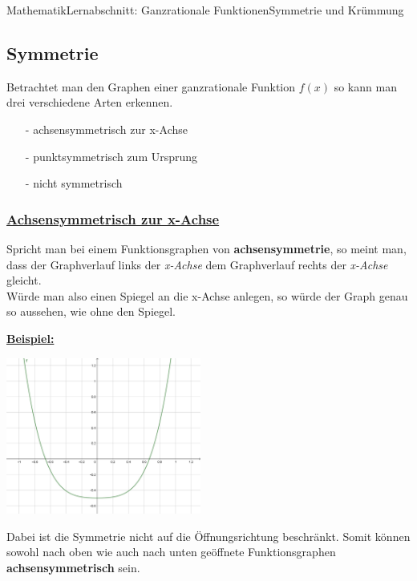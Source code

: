 \documentclass[11pt,twocolumn,oneside,openany,headings=optiontotoc,11pt,numbers=noenddot]{article}
\begin{document}
	\begin{worksheet}{Mathematik}{Lernabschnitt: Ganzrationale Funktionen}{Symmetrie und Krümmung}
		\setcounter{section}{6}
		\setcounter{subsection}{3}
		\noindent
		\subsection{Symmetrie}
		Betrachtet man den Graphen einer ganzrationale Funktion \(f(x)\) so kann man drei verschiedene Arten erkennen.
		\begin{itemize}
			\item[-] achsensymmetrisch zur x-Achse
			\item[-] punktsymmetrisch zum Ursprung
			\item[-] nicht symmetrisch
		\end{itemize}
		\subsubsection{\underline{Achsensymmetrisch zur x-Achse}}
		Spricht man bei einem Funktionsgraphen von \textbf{achsensymmetrie}, so meint man, dass der Graphverlauf links der \textit{x-Achse} dem Graphverlauf rechts der \textit{x-Achse} gleicht.\\
		Würde man also einen Spiegel an die x-Achse anlegen, so würde der Graph genau so aussehen, wie ohne den Spiegel.\\
		\par\noindent
		\underline{\textbf{Beispiel:}}\\
		\par\noindent
		\includegraphics[width=0.48\textwidth]{../99_Bilder/asymm.jpg}\\
		\par\noindent
		Dabei ist die Symmetrie nicht auf die Öffnungsrichtung beschränkt. Somit können sowohl nach oben wie auch nach unten geöffnete Funktionsgraphen \textbf{achsensymmetrisch} sein.\\
		\par\noindent

\end{worksheet}
\end{document}
